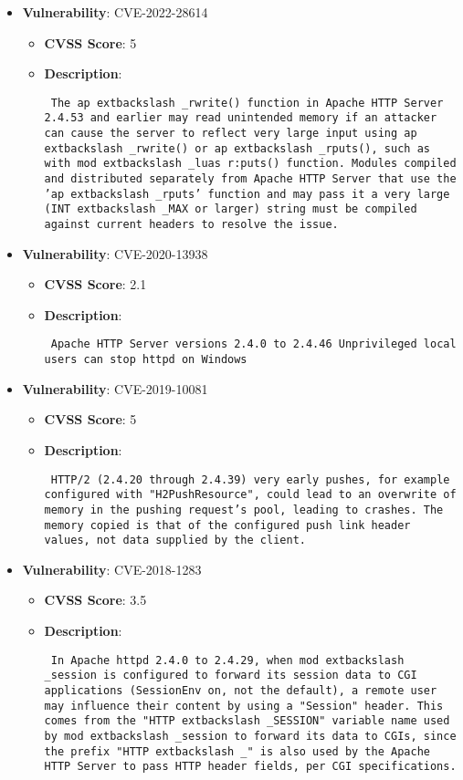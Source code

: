 \documentclass{article}
\begin{document}
\begin{itemize}
        \item \textbf{Vulnerability}: CVE-2022-28614
        \begin{itemize}
            \item \textbf{CVSS Score}:  5 
            \item \textbf{Description}: \parbox{\linewidth}{\texttt{ The ap	extbackslash _rwrite() function in Apache HTTP Server 2.4.53 and earlier may read unintended memory if an attacker can cause the server to reflect very large input using ap	extbackslash _rwrite() or ap	extbackslash _rputs(), such as with mod	extbackslash _luas r:puts() function. Modules compiled and distributed separately from Apache HTTP Server that use the 'ap	extbackslash _rputs' function and may pass it a very large (INT	extbackslash _MAX or larger) string must be compiled against current headers to resolve the issue. }}
        \end{itemize}
    
        \item \textbf{Vulnerability}: CVE-2020-13938
        \begin{itemize}
            \item \textbf{CVSS Score}:  2.1 
            \item \textbf{Description}: \parbox{\linewidth}{\texttt{ Apache HTTP Server versions 2.4.0 to 2.4.46 Unprivileged local users can stop httpd on Windows }}
        \end{itemize}
    
        \item \textbf{Vulnerability}: CVE-2019-10081
        \begin{itemize}
            \item \textbf{CVSS Score}:  5 
            \item \textbf{Description}: \parbox{\linewidth}{\texttt{ HTTP/2 (2.4.20 through 2.4.39) very early pushes, for example configured with "H2PushResource", could lead to an overwrite of memory in the pushing request's pool, leading to crashes. The memory copied is that of the configured push link header values, not data supplied by the client. }}
        \end{itemize}
    
        \item \textbf{Vulnerability}: CVE-2018-1283
        \begin{itemize}
            \item \textbf{CVSS Score}:  3.5 
            \item \textbf{Description}: \parbox{\linewidth}{\texttt{ In Apache httpd 2.4.0 to 2.4.29, when mod	extbackslash _session is configured to forward its session data to CGI applications (SessionEnv on, not the default), a remote user may influence their content by using a "Session" header. This comes from the "HTTP	extbackslash _SESSION" variable name used by mod	extbackslash _session to forward its data to CGIs, since the prefix "HTTP	extbackslash _" is also used by the Apache HTTP Server to pass HTTP header fields, per CGI specifications. }}
        \end{itemize}
    

\end{itemize}
\end{document}
